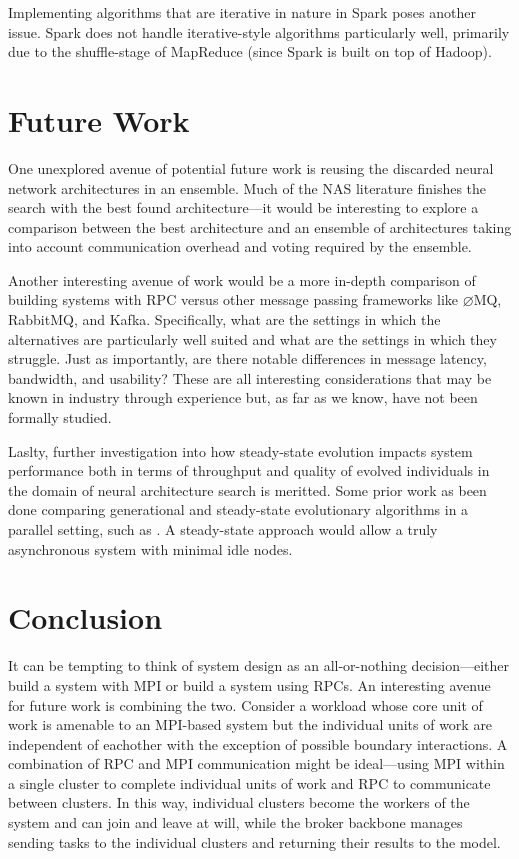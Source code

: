\documentclass[conference]{IEEEtran}
\begin{document}
Implementing algorithms that are iterative in nature in Spark poses another
issue. Spark does not handle iterative-style algorithms particularly well,
primarily due to the shuffle-stage of MapReduce (since Spark is built on
top of Hadoop).

\section{Future Work}
One unexplored avenue of potential future work is reusing the discarded
neural network architectures in an ensemble. Much of the NAS literature
finishes the search with the best found architecture---it would be interesting
to explore a comparison between the best architecture and an ensemble of
architectures taking into account communication overhead and voting required
by the ensemble.

Another interesting avenue of work would be a more in-depth comparison of
building systems with RPC versus other message passing frameworks like
$\varnothing$MQ, RabbitMQ, and Kafka. Specifically, what are the settings
in which the alternatives are particularly well suited and what are the
settings in which they struggle. Just as importantly, are there notable
differences in message latency, bandwidth, and usability? These are all
interesting considerations that may be known in industry through experience
but, as far as we know, have not been formally studied.

Laslty, further investigation into how steady-state evolution impacts
system performance both in terms of throughput and quality of evolved
individuals in the domain of neural architecture search is meritted.
Some prior work as been done comparing generational
and steady-state evolutionary algorithms in a parallel setting, such as
\cite{10.1007/3-540-45356-3_40, 10.1007/978-3-540-30217-9_26,
  Zavoianu:2015:PCG:2827032.2827154}. A steady-state approach would allow
a truly asynchronous system with minimal idle nodes.

\section{Conclusion}
It can be tempting to think of system design as an all-or-nothing
decision---either build a system with MPI or build a system using RPCs. An
interesting avenue for future work is combining the two. Consider a workload
whose core unit of work is amenable to an MPI-based system but the individual
units of work are independent of eachother with the exception of possible
boundary interactions. A combination of RPC and MPI communication might be
ideal---using MPI within a single cluster to complete individual units of work
and RPC to communicate between clusters. In this way, individual clusters become
the workers of the system and can join and leave at will, while the broker
backbone manages sending tasks to the individual clusters and returning their
results to the model.
\balance


\end{document}
